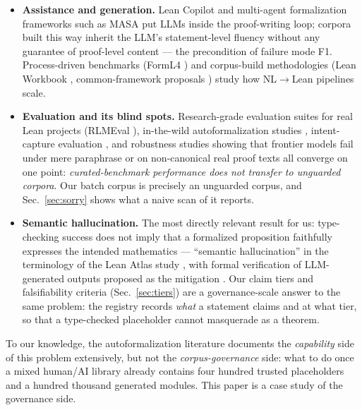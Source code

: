 \begin{itemize}
\item \textbf{Assistance and generation.} Lean Copilot
\cite{leancopilot2024} and multi-agent formalization frameworks such as
MASA \cite{masa2025} put LLMs inside the proof-writing loop; corpora
built this way inherit the LLM's statement-level fluency without any
guarantee of proof-level content --- the precondition of failure
mode F1. Process-driven benchmarks (FormL4 \cite{forml4}) and
corpus-build methodologies (Lean Workbook \cite{leanworkbook},
common-framework proposals \cite{commonframework2025}) study how
NL$\to$Lean pipelines scale.
\item \textbf{Evaluation and its blind spots.} Research-grade
evaluation suites for real Lean projects (RLMEval \cite{rlmeval2025}),
in-the-wild autoformalization studies \cite{wild2025}, intent-capture
evaluation \cite{userintent2024}, and robustness studies showing that
frontier models fail under mere paraphrase \cite{paraphrase2026} or on
non-canonical real proof texts \cite{robustness2026} all converge on one
point: \emph{curated-benchmark performance does not transfer to
unguarded corpora}. Our batch corpus is precisely an unguarded
corpus, and Sec.~\ref{sec:sorry} shows what a naive scan of it
reports.
\item \textbf{Semantic hallucination.} The most directly relevant
result for us: type-checking success does not imply that a
formalized proposition faithfully expresses the intended mathematics
--- ``semantic hallucination'' in the terminology of the Lean Atlas
study \cite{leanatlas2026}, with formal verification of LLM-generated
outputs proposed as the mitigation \cite{llmoutput2025}. Our claim
tiers and falsifiability criteria
(Sec.~\ref{sec:tiers}) are a governance-scale answer to the
same problem: the registry records \emph{what} a statement claims
and at what tier, so that a type-checked placeholder cannot masquerade
as a theorem.
\end{itemize}

To our knowledge, the autoformalization literature documents the
\emph{capability} side of this problem extensively, but not the
\emph{corpus-governance} side: what to do once a mixed
human/AI library already contains four hundred trusted placeholders
and a hundred thousand generated modules. This paper is a case
study of the governance side.

